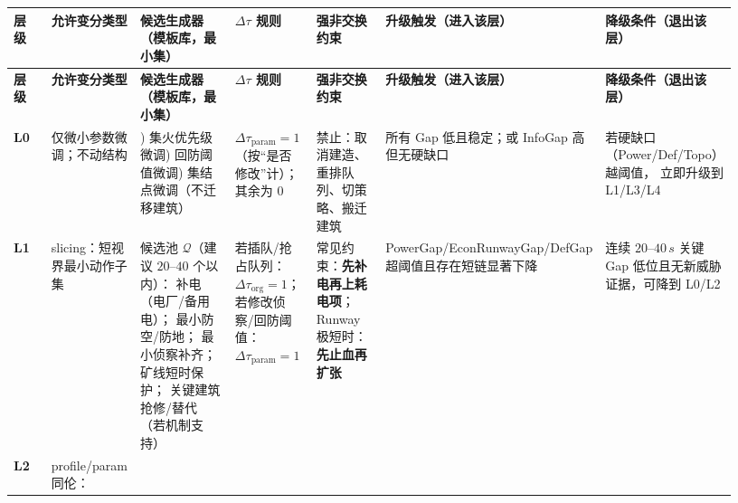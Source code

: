 \documentclass[12pt]{article}
\begin{document}
\begin{CJK*}{UTF8}{gkai}
\begingroup
\scriptsize
\setlength{\tabcolsep}{2pt}
\renewcommand{\arraystretch}{1.2}
\setlength{\LTleft}{0pt}
\setlength{\LTright}{0pt}
\begin{longtable}{|
  >{\raggedright\arraybackslash}p{0.07\linewidth}|
  >{\raggedright\arraybackslash}p{0.09\linewidth}|
  >{\raggedright\arraybackslash}p{0.23\linewidth}|
  >{\raggedright\arraybackslash}p{0.12\linewidth}|
  >{\raggedright\arraybackslash}p{0.12\linewidth}|
  >{\raggedright\arraybackslash}p{0.15\linewidth}|
  >{\raggedright\arraybackslash}p{0.15\linewidth}|}
\hline
\textbf{层级} & \textbf{允许变分类型} & \textbf{候选生成器（模板库，最小集）} & \textbf{$\Delta\tau$ 规则} & \textbf{强非交换约束} & \textbf{升级触发（进入该层）
  } & \textbf{降级条件（退出该层）} \\
\hline
\endfirsthead
\hline
\textbf{层级} & \textbf{允许变分类型} & \textbf{候选生成器（模板库，最小集）} & \textbf{$\Delta\tau$ 规则} & \textbf{强非交换约束} & \textbf{升级触发（进入该层）
  } & \textbf{降级条件（退出该层）} \\
\hline
\endhead
\textbf{L0}
& 仅微小参数微调；不动结构
& 1) 集火优先级微调\newline 2) 回防阈值微调\newline 3) 集结点微调（不迁移建筑）
& $\Delta\tau_{\mathrm{param}}=1$（按“是否修改”计）；其余为 $0$
& 禁止：取消建造、重排队列、切策略、搬迁建筑
& 所有 Gap 低且稳定；或 InfoGap 高但无硬缺口
& 若硬缺口（Power/\allowbreak Def/\allowbreak Topo）越阈值，
\newline 立即升级到 L1/\allowbreak L3/\allowbreak L4
\\ \hline
\textbf{L1}
& slicing：短视界最小动作子集
& 候选池 $\mathcal{Q}$（建议 $20$--$40$ 个以内）：
\newline 补电（电厂/备用电）；
\newline 最小防空/防地；
\newline 最小侦察补齐；
\newline 矿线短时保护；
\newline 关键建筑抢修/替代（若机制支持）
& 若插队/抢占队列：$\Delta\tau_{\mathrm{org}}=1$；
\newline 若修改侦察/回防阈值：$\Delta\tau_{\mathrm{param}}=1$
& 常见约束：\textbf{先补电再上耗电项}；
\newline Runway 极短时：\textbf{先止血再扩张}
& PowerGap/\allowbreak EconRunwayGap/\allowbreak DefGap 超阈值且存在短链显著下降
& 连续 $20$--$40\,s$ 关键 Gap 低位且无新威胁证据，可降到 L0/L2
\\ \hline
\textbf{L2}
& profile/\allowbreak param 同伦：

\end{longtable}
\end{CJK*}
\end{document}
